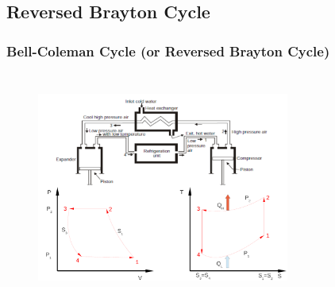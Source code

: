 \documentclass[10pt,compress]{beamer}
\begin{document}
\subsection{Reversed Brayton Cycle}
\begin{frame}
 \frametitle{Bell-Coleman Cycle (or Reversed Brayton Cycle)}
    \begin{figure}%
     \begin{center}
      \includegraphics[width=8.3cm,height=7.6cm]{./Pics/Overview_Refrig6}
     \end{center}
    \end{figure}  
\end{frame}
\end{document}
